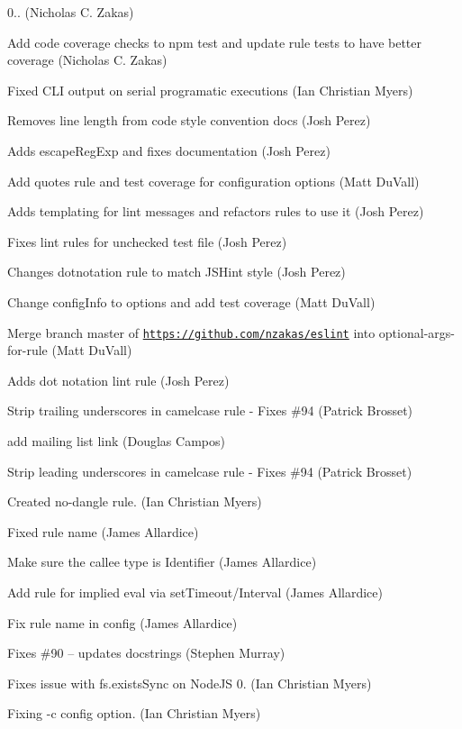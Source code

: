 \begin{DoxyItemize}
\item 0.. (Nicholas C. Zakas)
\item Add code coverage checks to npm test and update rule tests to have better coverage (Nicholas C. Zakas)
\item Fixed C\+LI output on serial programatic executions (Ian Christian Myers)
\item Removes line length from code style convention docs (Josh Perez)
\item Adds escape\+Reg\+Exp and fixes documentation (Josh Perez)
\item Add quotes rule and test coverage for configuration options (Matt Du\+Vall)
\item Adds templating for lint messages and refactors rules to use it (Josh Perez)
\item Fixes lint rules for unchecked test file (Josh Perez)
\item Changes dotnotation rule to match J\+S\+Hint style (Josh Perez)
\item Change config\+Info to options and add test coverage (Matt Du\+Vall)
\item Merge branch \textquotesingle{}master\textquotesingle{} of \href{https://github.com/nzakas/eslint}{\tt https\+://github.\+com/nzakas/eslint} into optional-\/args-\/for-\/rule (Matt Du\+Vall)
\item Adds dot notation lint rule (Josh Perez)
\item Strip trailing underscores in camelcase rule -\/ Fixes \#94 (Patrick Brosset)
\item add mailing list link (Douglas Campos)
\item Strip leading underscores in camelcase rule -\/ Fixes \#94 (Patrick Brosset)
\item Created no-\/dangle rule. (Ian Christian Myers)
\item Fixed rule name (James Allardice)
\item Make sure the callee type is Identifier (James Allardice)
\item Add rule for implied eval via set\+Timeout/\+Interval (James Allardice)
\item Fix rule name in config (James Allardice)
\item Fixes \#90 -- updates docstrings (Stephen Murray)
\item Fixes issue with fs.\+exists\+Sync on Node\+JS 0. (Ian Christian Myers)
\item Fixing -\/c config option. (Ian Christian Myers)

\end{DoxyItemize}
